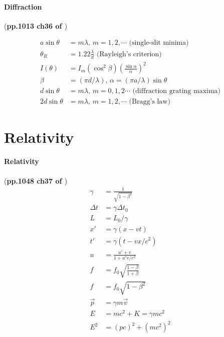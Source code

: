 \documentclass{article}
\numberwithin{equation}{subsection} %
\theoremstyle{definition}
\begin{document}
\paragraph{Diffraction} (\textbf{pp.1013 ch36 of \cite{book}})

\begin{align}
    a\sin{\theta} &= m \lambda \text{, $m=1,2,\cdots$ (single-slit
    minima)} \\
    \theta_R &= 1.22\frac{\lambda}{d} \text{ (Rayleigh's criterion)}
    \\
    I(\theta) &=  I_m
      (\cos^2\beta)\left(\frac{\sin{\alpha}}{\alpha}\right)^2 \\
    \beta &= (\pi d/\lambda),\, \alpha = (\pi a/\lambda)\sin\theta \\
    d\sin{\theta} &= m\lambda \text{, $m=0,1,2\cdots$ (diffraction
      grating maxima)} \\
    2d\sin{\theta} &= m\lambda \text{, $m=1,2,\cdots$ (Bragg's law)}
\end{align}

\section{Relativity}
\label{sec:Relativity}

\paragraph{Relativity} (\textbf{pp.1048 ch37 of \cite{book}})
\begin{align}
    \gamma &= \frac{1}{\sqrt{1-\beta^2}} \\
    \Delta t &= \gamma \Delta t_0 \\
    L &= L_0/\gamma \\
    x' &= \gamma(x-vt) \\
    t' &= \gamma(t-vx/c^2) \\
    u &= \frac{u'+v}{1+u'v/c^2} \\
    f &= f_0 \sqrt{\frac{1-\beta}{1+\beta}} \\
    f &= f_0 \sqrt{1-\beta^2} \\
    \vec{p} &= \gamma m \vec{v} \\
    E &= mc^2 + K = \gamma mc^2 \\
    E^2 &= (pc)^2 + (mc^2)^2
\end{align}
\end{document}
